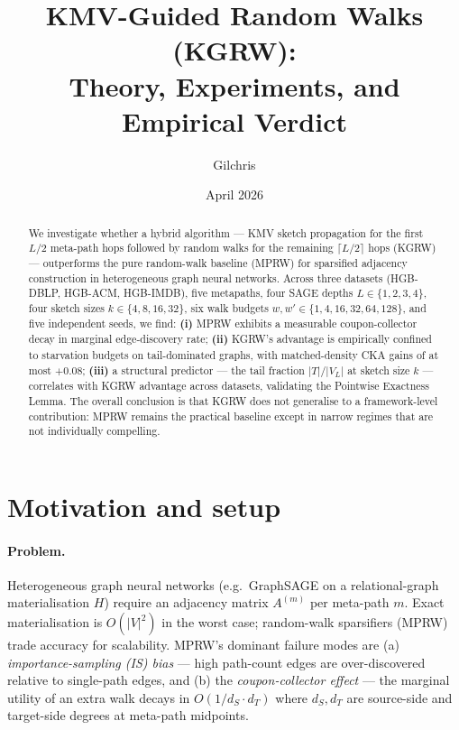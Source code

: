 \documentclass[11pt]{article}
\title{KMV-Guided Random Walks (KGRW):\\
Theory, Experiments, and Empirical Verdict}
\author{Gilchris}
\date{April 2026}
\begin{document}
\maketitle

\begin{abstract}
\noindent
We investigate whether a hybrid algorithm — KMV sketch propagation for the
first $L/2$ meta-path hops followed by random walks for the remaining
$\lceil L/2 \rceil$ hops (KGRW) — outperforms the pure random-walk baseline
(MPRW) for sparsified adjacency construction in heterogeneous graph neural
networks. Across three datasets (HGB-DBLP, HGB-ACM, HGB-IMDB), five metapaths,
four SAGE depths $L \in \{1,2,3,4\}$, four sketch sizes $k \in \{4,8,16,32\}$,
six walk budgets $w, w' \in \{1,4,16,32,64,128\}$, and five independent seeds,
we find: \textbf{(i)} MPRW exhibits a measurable coupon-collector decay in
marginal edge-discovery rate; \textbf{(ii)} KGRW's advantage is empirically
confined to starvation budgets on tail-dominated graphs, with matched-density
CKA gains of at most $+0.08$; \textbf{(iii)} a structural predictor — the
tail fraction $|T|/|V_L|$ at sketch size $k$ — correlates with KGRW advantage
across datasets, validating the Pointwise Exactness Lemma. The overall
conclusion is that KGRW does not generalise to a framework-level contribution:
MPRW remains the practical baseline except in narrow regimes that are not
individually compelling.
\end{abstract}

\section{Motivation and setup}

\paragraph{Problem.}
Heterogeneous graph neural networks (e.g.\ GraphSAGE on a relational-graph
materialisation $H$) require an adjacency matrix $A^{(m)}$ per meta-path $m$.
Exact materialisation is $O(|V|^2)$ in the worst case; random-walk
sparsifiers (MPRW) trade accuracy for scalability. MPRW's dominant failure
modes are (a) \emph{importance-sampling (IS) bias} —
high path-count edges are over-discovered relative to single-path edges,
and (b) the \emph{coupon-collector effect} — the marginal utility of an extra
walk decays in $O(1/d_S \cdot d_T)$ where $d_S, d_T$ are source-side and
target-side degrees at meta-path midpoints.
\end{document}
